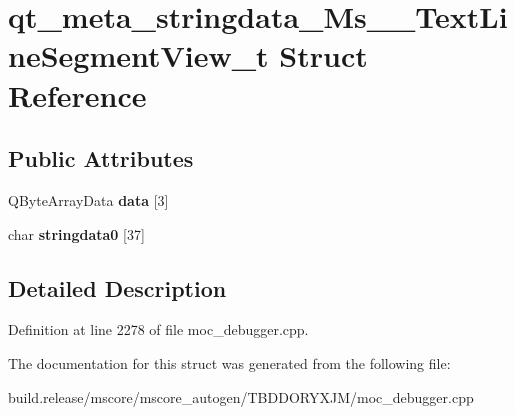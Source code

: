 \hypertarget{structqt__meta__stringdata___ms_____text_line_segment_view__t}{}\section{qt\+\_\+meta\+\_\+stringdata\+\_\+\+Ms\+\_\+\+\_\+\+Text\+Line\+Segment\+View\+\_\+t Struct Reference}
\label{structqt__meta__stringdata___ms_____text_line_segment_view__t}
\subsection*{Public Attributes}
\begin{DoxyCompactItemize}
\item 
\mbox{\label{structqt__meta__stringdata___ms_____text_line_segment_view__t_add9a0e17b99844d96d64377a457abc6f}} 
Q\+Byte\+Array\+Data {\bfseries data} \mbox{[}3\mbox{]}
\item 
\mbox{\label{structqt__meta__stringdata___ms_____text_line_segment_view__t_a7f1631e02deb59ed9186ac351078c94c}} 
char {\bfseries stringdata0} \mbox{[}37\mbox{]}
\end{DoxyCompactItemize}


\subsection{Detailed Description}


Definition at line 2278 of file moc\+\_\+debugger.\+cpp.



The documentation for this struct was generated from the following file\+:\begin{DoxyCompactItemize}
\item 
build.\+release/mscore/mscore\+\_\+autogen/\+T\+B\+D\+D\+O\+R\+Y\+X\+J\+M/moc\+\_\+debugger.\+cpp\end{DoxyCompactItemize}
